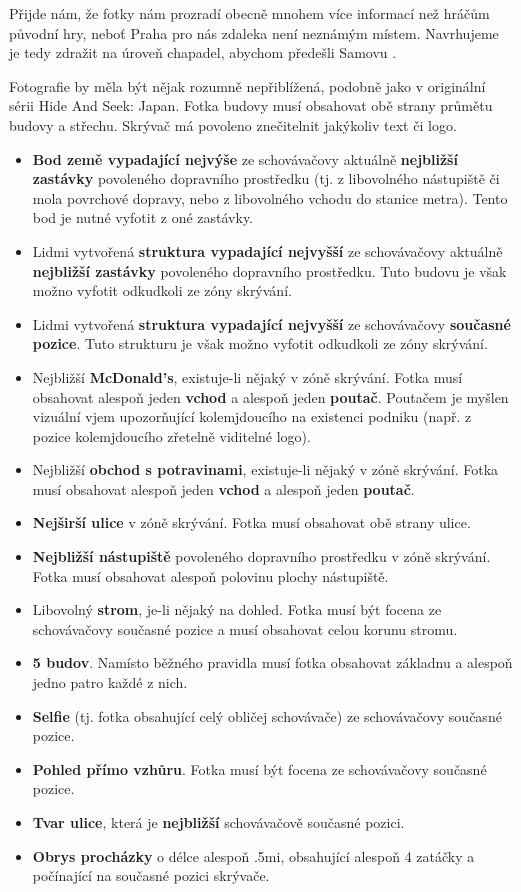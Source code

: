 \begin{reasoning}
	Přijde nám, že fotky nám prozradí obecně mnohem více informací než hráčům původní hry, neboť Praha pro nás zdaleka není neznámým místem. Navrhujeme je tedy zdražit na úroveň chapadel, abychom předešli Samovu .
\end{reasoning}

Fotografie by měla být nějak rozumně nepřiblížená, podobně jako v originální sérii Hide And Seek: Japan. Fotka budovy musí obsahovat obě strany průmětu budovy a střechu. Skrývač má povoleno znečitelnit jakýkoliv text či logo.

\begin{itemize}
	\item \textbf{Bod země vypadající nejvýše} ze schovávačovy aktuálně \textbf{nejbližší zastávky} povoleného dopravního prostředku (tj. z libovolného nástupiště či mola povrchové dopravy, nebo z libovolného vchodu do stanice metra). Tento bod je nutné vyfotit z oné zastávky.
	\item Lidmi vytvořená \textbf{struktura vypadající nejvyšší} ze schovávačovy aktuálně \textbf{nejbližší zastávky} povoleného dopravního prostředku. Tuto budovu je však možno vyfotit odkudkoli ze zóny skrývání.
	\item Lidmi vytvořená \textbf{struktura vypadající nejvyšší} ze schovávačovy \textbf{současné pozice}. Tuto strukturu je však možno vyfotit odkudkoli ze zóny skrývání.
	\item Nejbližší \textbf{McDonald's}, existuje-li nějaký v zóně skrývání. Fotka musí obsahovat alespoň jeden \textbf{vchod} a alespoň jeden \textbf{poutač}. Poutačem je myšlen vizuální vjem upozorňující kolemjdoucího na existenci podniku (např. z pozice kolemjdoucího zřetelně viditelné logo).
	\item Nejbližší \textbf{obchod s potravinami}, existuje-li nějaký v zóně skrývání. Fotka musí obsahovat alespoň jeden \textbf{vchod} a alespoň jeden \textbf{poutač}.
	\item \textbf{Nejširší ulice} v zóně skrývání. Fotka musí obsahovat obě strany ulice.
	\item \textbf{Nejbližší nástupiště} povoleného dopravního prostředku v zóně skrývání. Fotka musí obsahovat alespoň polovinu plochy nástupiště.
	\item Libovolný \textbf{strom}, je-li nějaký na dohled. Fotka musí být focena ze schovávačovy současné pozice a musí obsahovat celou korunu stromu.
	\item \textbf{5 budov}. Namísto běžného pravidla musí fotka obsahovat základnu a alespoň jedno patro každé z nich.
	\item \textbf{Selfie} (tj. fotka obsahující celý obličej schovávače) ze schovávačovy současné pozice.
	\item \textbf{Pohled přímo vzhůru}. Fotka musí být focena ze schovávačovy současné pozice.
	\item \textbf{Tvar ulice}, která je \textbf{nejbližší} schovávačově současné pozici.
	\item \textbf{Obrys procházky} o délce alespoň \dist.5mi, obsahující alespoň 4 zatáčky a počínající na současné pozici skrývače.
\end{itemize}
